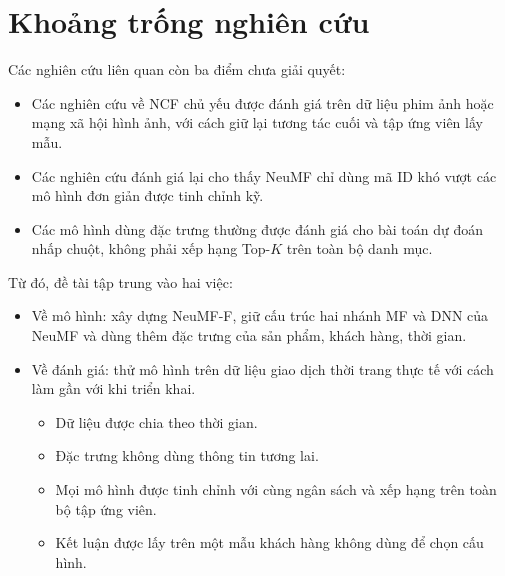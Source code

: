 \section{Khoảng trống nghiên cứu}
\label{sec:khoangtrong_nghiencuu}

Các nghiên cứu liên quan còn ba điểm chưa giải quyết:
\begin{itemize}
    \item Các nghiên cứu về NCF chủ yếu được đánh giá trên dữ liệu phim ảnh hoặc mạng xã hội hình ảnh, với cách giữ lại tương tác cuối và tập ứng viên lấy mẫu.
    \item Các nghiên cứu đánh giá lại cho thấy NeuMF chỉ dùng mã ID khó vượt các mô hình đơn giản được tinh chỉnh kỹ.
    \item Các mô hình dùng đặc trưng thường được đánh giá cho bài toán dự đoán nhấp chuột, không phải xếp hạng Top-$K$ trên toàn bộ danh mục.
\end{itemize}

Từ đó, đề tài tập trung vào hai việc:
\begin{itemize}
    \item Về mô hình: xây dựng NeuMF-F, giữ cấu trúc hai nhánh MF và DNN của NeuMF và dùng thêm đặc trưng của sản phẩm, khách hàng, thời gian.
    \item Về đánh giá: thử mô hình trên dữ liệu giao dịch thời trang thực tế với cách làm gần với khi triển khai.
    \begin{itemize}
        \item Dữ liệu được chia theo thời gian.
        \item Đặc trưng không dùng thông tin tương lai.
        \item Mọi mô hình được tinh chỉnh với cùng ngân sách và xếp hạng trên toàn bộ tập ứng viên.
        \item Kết luận được lấy trên một mẫu khách hàng không dùng để chọn cấu hình.
    \end{itemize}
\end{itemize}

\FloatBarrier
